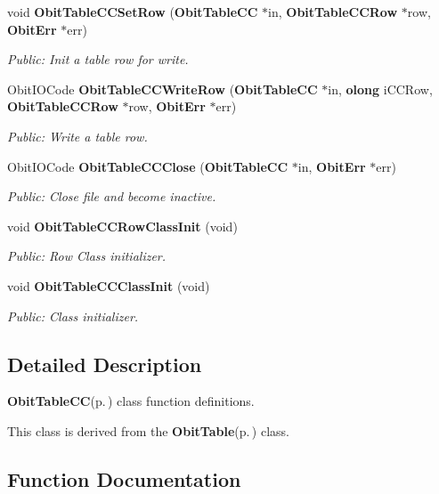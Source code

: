 \begin{CompactItemize}
void {\bf Obit\-Table\-CCSet\-Row} ({\bf Obit\-Table\-CC} $\ast$in, {\bf Obit\-Table\-CCRow} $\ast$row, {\bf Obit\-Err} $\ast$err)
\begin{CompactList}\small\item\em Public: Init a table row for write. \item\end{CompactList}\item 
Obit\-IOCode {\bf Obit\-Table\-CCWrite\-Row} ({\bf Obit\-Table\-CC} $\ast$in, {\bf olong} i\-CCRow, {\bf Obit\-Table\-CCRow} $\ast$row, {\bf Obit\-Err} $\ast$err)
\begin{CompactList}\small\item\em Public: Write a table row. \item\end{CompactList}\item 
Obit\-IOCode {\bf Obit\-Table\-CCClose} ({\bf Obit\-Table\-CC} $\ast$in, {\bf Obit\-Err} $\ast$err)
\begin{CompactList}\small\item\em Public: Close file and become inactive. \item\end{CompactList}\item 
void {\bf Obit\-Table\-CCRow\-Class\-Init} (void)
\begin{CompactList}\small\item\em Public: Row Class initializer. \item\end{CompactList}\item 
void {\bf Obit\-Table\-CCClass\-Init} (void)
\begin{CompactList}\small\item\em Public: Class initializer. \item\end{CompactList}\end{CompactItemize}


\subsection{Detailed Description}
{\bf Obit\-Table\-CC}{\rm (p.\,\pageref{structObitTableCC})} class function definitions. 

This class is derived from the {\bf Obit\-Table}{\rm (p.\,\pageref{structObitTable})} class.

\subsection{Function Documentation}
